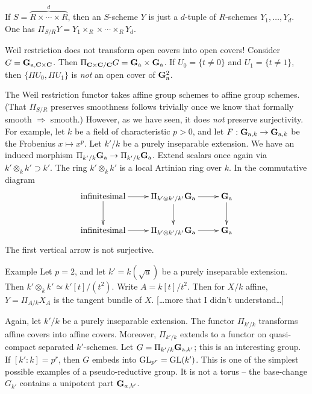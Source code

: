 If $S=\overbrace{R\times \cdots \times R}^d$, then an $S$-scheme $Y$ is just a 
$d$-tuple of $R$-schemes $Y_1,\dots,Y_d$. One has 
$\Pi_{S/R} Y = Y_1\times_R \times \cdots \times_R Y_d$. 

Weil restriction does not transform open covers into open covers! Consider 
$G=\mathbf{G}_{\mathrm{a}, \mathbf{C}\times \mathbf{C}}$. Then 
$\Pi_{\mathbf{C}\times \mathbf{C}/\mathbf{C}} G = \mathbf{G}_{\mathrm{a}} \times \mathbf{G}_{\mathrm{a}}$. If 
$U_0=\{t\ne 0\}$ and $U_1=\{t\ne 1\}$, then 
$\{\Pi U_0,\Pi U_1\}$ is \emph{not} an open cover of $\mathbf{G}_{\mathrm{a}}^2$. 

The Weil restriction functor takes affine group schemes to affine group 
schemes. (That $\Pi_{S/R}$ preserves smoothness follows trivially once we 
know that formally smooth $\Rightarrow$ smooth.) However, as we have seen, 
it does \emph{not} preserve surjectivity. For example, let $k$ be a field 
of characteristic $p>0$, and let $F:\mathbf{G}_{\mathrm{a},k} \to \mathbf{G}_{\mathrm{a},k}$ be the 
Frobenius $x\mapsto x^p$. Let $k'/k$ be a purely inseparable extension. We have 
an induced morphism $\Pi_{k'/k} \mathbf{G}_{\mathrm{a}} \to \Pi_{k'/k} \mathbf{G}_{\mathrm{a}}$. 
Extend scalars once again via $k'\otimes_k k' \supset k'$. The ring 
$k'\otimes_k k'$ is a local Artinian ring over $k$. In the 
commutative diagram 
\[\xymatrix{
  \text{infinitesimal} \ar[r] \ar[d] 
    & \Pi_{k'\otimes k' / k'} \dG_\additive \ar[r] \ar[d] 
    & \dG_\additive \ar[d] \\
  \text{infinitesimal} \ar[r] 
    & \Pi_{k'\otimes k' / k'} \dG_\additive \ar[r] 
    & \dG_\additive
}\]
The first vertical arrow is not surjective. 

\begin{enonce}[remark]{Example}
Let $p=2$, and let $k'=k(\sqrt a)$ be a purely inseparable extension. 
Then $k'\otimes_k k'\simeq k'[t]/(t^2)$. Write $A=k[t]/t^2$. Then for 
$X/k$ affine, $Y=\Pi_{A/k} X_A$ is the tangent bundle of $X$. 
[\ldots more that I didn't understand\ldots ]
\end{enonce}

Again, let $k'/k$ be a purely inseparable extension. The functor 
$\Pi_{k'/k}$ transforms affine covers into affine covers. Moreover, 
$\Pi_{k'/k}$ extends to a functor on quasi-compact separated 
$k'$-schemes. Let $G=\Pi_{k'/k} \mathbf{G}_{\mathrm{a},k'}$; this is an 
interesting group. If $[k':k]=p^r$, then $G$ embeds into 
$\operatorname{GL}_{p^r} = \operatorname{GL}(k')$. This is one of the simplest 
possible examples of a pseudo-reductive group. It is not a torus -- the 
base-change $G_{k'}$ contains a unipotent part $\mathbf{G}_{a,k'}$.





